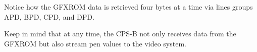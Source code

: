 Notice how the GFXROM data is retrieved four bytes at a time via lines groups APD, BPD, CPD, and DPD. 

Keep in mind that at any time, the CPS-B not only receives data from the GFXROM but also stream pen values to the video system. 
















